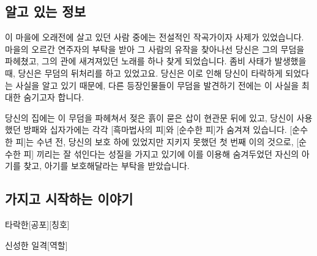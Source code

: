 \documentclass{report}
\begin{document}
	\subsection*{알고 있는 정보}
		이 마을에 오래전에 살고 있던 사람 중에는 전설적인 작곡가이자 사제가 있었습니다. 마을의 오르간 연주자의 부탁을 받아 그 사람의 유작을 찾아나선 당신은 그의 무덤을 파헤쳤고, 그의 관에 새겨져있던 노래를 하나 찾게 되었습니다. 좀비 사태가 발생했을 때, 당신은 무덤의 뒤처리를 하고 있었고요. 당신은 이로 인해 당신이 타락하게 되었다는 사실을 알고 있기 때문에, 다른 등장인물들이 무덤을 발견하기 전에는 이 사실을 최대한 숨기고자 합니다.
		
		당신의 집에는 이 무덤을 파헤쳐서 젖은 흙이 묻은 삽이 현관문 뒤에 있고, 당신이 사용했던 방패와 십자가에는 각각 [흑마법사의 피]와 [순수한 피]가 숨겨져 있습니다. [순수한 피]는 수년 전, 당신의 보호 하에 있었지만 지키지 못했던 첫 번째 이의 것으로, [순수한 피] 끼리는 잘 섞인다는 성질을 가지고 있기에 이를 이용해 숨겨두었던 자신의 아기를 찾고, 아기를 보호해달라는 부탁을 받았습니다.
	
	\subsection*{가지고 시작하는 이야기}
		\begin{spoiler}{타락한}{[공포][칭호]}
			
		\end{spoiler}
		
		\begin{spoiler}{신성한 일격}{[역할]}
		\end{spoiler}
	
\end{document}
